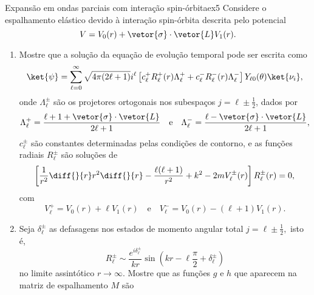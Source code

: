 \begin{exercício}{Expansão em ondas parciais com interação spin-órbita\cite{gottfried}}{ex5}
   Considere o espalhamento elástico devido à interação spin-órbita descrita pelo potencial
   \begin{equation*}
      V = V_0(r) + \vetor{\sigma} \cdot \vetor{L} V_1(r).
   \end{equation*}
   \begin{enumerate}[label=(\alph*)]
       \item Mostre que a solução da equação de evolução temporal pode ser escrita como
          \begin{equation*}
             \ket{\psi} = \sum_{\ell = 0}^{\infty} \sqrt{4\pi (2\ell + 1)} i^\ell \left[c_\ell^+ R_{\ell}^+(r) \Lambda_{\ell}^+ + c_{\ell}^- R_{\ell}^-(r) \Lambda_\ell^-\right]Y_{\ell 0}(\theta) \ket{\nu_i},
          \end{equation*}
          onde \(\Lambda_{\ell}^{\pm}\) são os projetores ortogonais nos subespaços \(j = \ell \pm \frac12\), dados por
          \begin{equation*}
             \Lambda_{\ell}^+ = \frac{\ell + 1 + \vetor{\sigma}\cdot\vetor{L}}{2\ell + 1}\quad\text{e}\quad
             \Lambda_{\ell}^- = \frac{\ell - \vetor{\sigma}\cdot\vetor{L}}{2\ell + 1},
          \end{equation*}
          \(c_{\ell}^\pm\) são constantes determinadas pelas condições de contorno, e as funções radiais \(R_{\ell}^\pm\) são soluções de
          \begin{equation*}
             \left[\frac{1}{r^2} \diff{}{r}r^2 \diff{}{r} - \frac{\ell (\ell + 1)}{r^2} + k^2 - 2m V_{\ell}^{\pm}(r)\right]R_{\ell}^{\pm}(r) = 0,
          \end{equation*}
          com
          \begin{equation*}
             V_{\ell}^{+} = V_0(r) + \ell V_1(r)\quad\text{e}\quad V_{\ell}^{-} = V_0(r) - (\ell + 1)V_1(r).
          \end{equation*}
       \item Seja \(\delta_{\ell}^{\pm}\) as defasagens nos estados de momento angular total \(j = \ell \pm \frac12,\) isto é,
          \begin{equation*}
             R_{\ell}^\pm \sim \frac{e^{i \delta_{\ell}^\pm}}{kr}\sin\left(kr - \ell \frac\pi2 + \delta_\ell^\pm\right)
          \end{equation*}
          no limite assintótico \(r \to \infty.\) Mostre que as funções \(g\) e \(h\) que aparecem na matriz de espalhamento \(M\) são

\end{enumerate}
\end{exercício}
